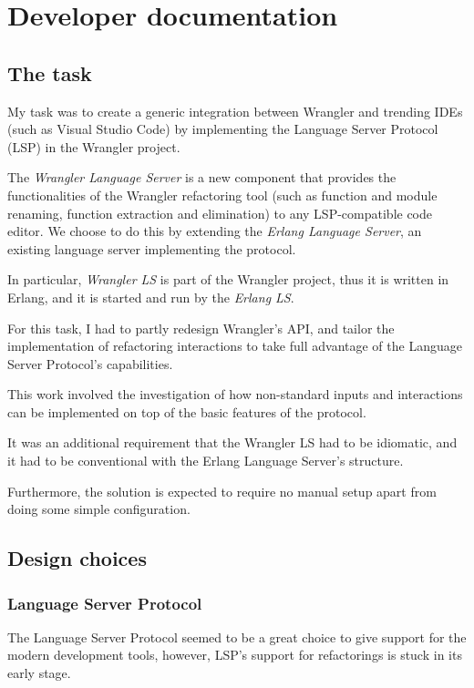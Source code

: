 \chapter{Developer documentation}
\label{ch:impl}

\section{The task}

My task was to create a generic integration between Wrangler and trending IDEs (such as Visual Studio Code) by implementing the Language Server Protocol (LSP) in the Wrangler project.

The \emph{Wrangler Language Server} is a new component that provides the functionalities of the Wrangler refactoring tool (such as function and module renaming, function extraction and elimination) to any LSP-compatible code editor. We choose to do this by extending the \emph{Erlang Language Server}, an existing language server implementing the protocol.

In particular, \emph{Wrangler LS} is part of the Wrangler project, thus it is written in Erlang, and it is started and run by the \emph{Erlang LS}.

For this task, I had to partly redesign Wrangler’s API, and tailor the implementation of refactoring interactions to take full advantage of the Language Server Protocol’s capabilities. 

This work involved the investigation of how non-standard inputs and interactions can be implemented on top of the basic features of the protocol.

It was an additional requirement that the Wrangler LS had to be idiomatic, and it had to be conventional with the Erlang Language Server's structure. 

Furthermore, the solution is expected to require no manual setup apart from doing some simple configuration.

\section{Design choices}

\subsection{Language Server Protocol}
\label{src:lsp-design-choices}

The Language Server Protocol seemed to be a great choice to give support for the modern development tools, however, LSP's support for refactorings is stuck in its early stage.

